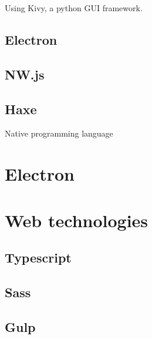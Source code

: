 Using Kivy, a python GUI framework.

\subsection{Electron}

\subsection{NW.js}

\subsection{Haxe}

Native programming language

\section{Electron}

\section{Web technologies}

\subsection{Typescript}

\subsection{Sass}

\subsection{Gulp}

